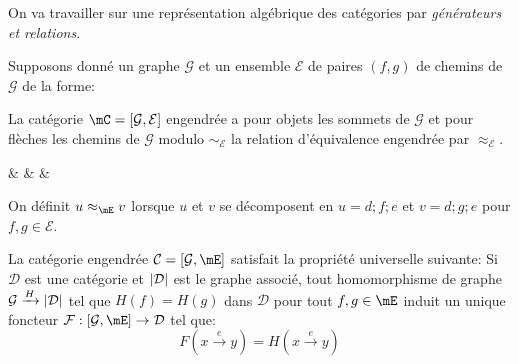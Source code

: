 \documentclass[math, info]{cours}
\begin{document}
\begin{exemple}
\begin{enumerate}
\begin{center}
			\end{center}
	\end{enumerate}
\end{exemple}

On va travailler sur une représentation algébrique des catégories par \textit{générateurs et relations}.
\begin{definition}
Supposons donné un graphe $\mathcal{G}$ et un ensemble $\mathcal{E}$ de paires $(f, g)$ de chemins de $\mathcal{G}$ de la forme:  
La catégorie $\mC = \left[ \mathcal{G}, \mathcal{E} \right]$ engendrée a pour objets les sommets de $\mathcal{G}$ et pour flèches les chemins de $\mathcal{G}$ modulo $\sim_{\mathcal{E}}$ la relation d'équivalence engendrée par $\approx_{\mathcal{E}}$.
\begin{category}
	\phantom{}\arrow[r, "d"] & \phantom{} & \phantom{}\ar[r, "e"] & \phantom{}
\end{category}
On définit $u \approx_{\mE} v$ lorsque $u$ et $v$ se décomposent en $u = d;f;e$ et $v = d;g;e$ pour $f, g \in \mathcal{E}$.
\end{definition}

\begin{proposition}
	La catégorie engendrée $\mathcal{C} = \left[ \mathcal{G}, \mE \right]$ satisfait la propriété universelle suivante:
	Si $\mathcal{D}$ est une catégorie et $\left|\mathcal{D}\right|$ est le graphe associé, tout homomorphisme de graphe $\mathcal{G}\xrightarrow{H} \left|\mathcal{D}\right|$ tel que $H(f) = H(g)$ dans $\mathcal{D}$ pour tout $f, g \in \mE$ induit un unique foncteur $\mathcal{F} : [\mathcal{G}, \mE] \to \mathcal{D}$ tel que:
	\begin{equation*}
		F(x\xrightarrow{e} y) = H(x\xrightarrow{e}y)
	\end{equation*}
	\label{prop:universelgraphefoncteur}
\end{proposition}
\end{document}
